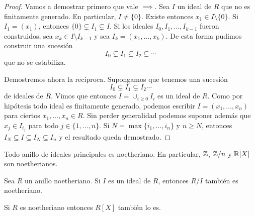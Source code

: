 \begin{proof}
	Vamos a demostrar primero que vale $\implies$. Sea $I$ un ideal de $R$ que no es finitamente generado. En particular, $I\ne\{0\}$. Existe entonces
	$x_1\in I\setminus\{0\}$. Si $I_1=(x_1)$, entonces $\{0\}\subsetneq I_1\subsetneq I$. Si los ideales 
	$I_0,I_1,\dots,I_{k-1}$ fueron construidos, sea $x_k\in I\setminus I_{k-1}$ y sea $I_k=(x_1,\dots,x_k)$. De esta forma pudimos construir una sucesión
	\[
	I_0\subsetneq I_1\subsetneq I_2\subsetneq\cdots 
	\]
	que no se estabiliza.   
	
	Demostremos ahora la recíproca. Supongamos que tenemos una sucesión
	\[
	I_0\subsetneq I_1\subsetneq I_2\cdots
	\]
	de ideales de $R$. Vimos que entonces $I=\cup_{i\geq0}I_i$ es un ideal de $R$. Como por hipótesis todo ideal es finitamente generado, podemos
	escribir $I=(x_1,\dots,x_n)$ para ciertos $x_1,\dots,x_n\in R$. Sin perder generalidad podemos suponer además que $x_j\in I_{i_j}$ para todo $j\in\{1,\dots,n\}$. Si 
	$N=\max\{i_1,\dots,i_n\}$ y $n\geq N$, entonces 
	$I_N\subseteq I\subseteq I_N\subseteq I_n$ y el resultado queda demostrado. 
\end{proof}

\begin{example}
Todo anillo de ideales principales es noetheriano. En particular, $\mathbb{Z}$, $\mathbb{Z}/n$ y $\mathbb{R}[X]$ son noetherianos. 	
\end{example}

\begin{exercise}
Sea $R$ un anillo noetheriano. Si $I$ es un ideal de $R$, entonces $R/I$ también es noetheriano.	
\end{exercise}

\begin{theorem}[Hilbert]
Si $R$ es noetheriano entonces $R[X]$ también lo es.
\end{theorem}

